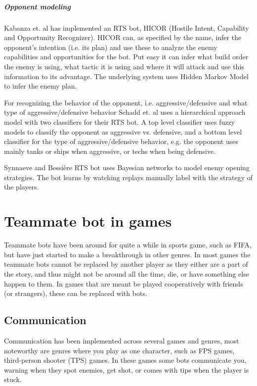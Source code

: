 \subparagraph{Opponent modeling}
Kabanza et. al has implemented an RTS bot, HICOR (Hostile Intent,
Capability and Opportunity Recognizer). HICOR can, as specified by the name, infer the opponent's
intention (i.e. its plan) and use these to analyze the enemy capabilities and opportunities for the
bot. Put easy it can infer what build order the enemy is using, what tactic it is using and where it
will attack and use this information to its advantage. The underlying system uses Hidden Markov
Model to infer the enemy plan.

For recognizing the behavior of the opponent, i.e. aggressive/defensive and what type of
aggressive/defensive behavior Schadd et. al uses a hierarchical approach model with two classifiers
for their RTS bot. A top level classifier uses fuzzy models to classify the opponent as aggressive
vs. defensive, and a bottom level classifier for the type of aggressive/defensive behavior, e.g. the
opponent uses mainly tanks or ships when aggressive, or techs when being defensive.

Synnaeve and Bessière RTS bot uses Bayesian networks to model enemy opening
strategies\cite{synnaeve11}. The bot learns by watching replays manually label with the strategy of
the players.

\section{Teammate bot in games}
Teammate bots have been around for quite a while in sports game,
such as FIFA\cite{fifa}, but have just started to make a breakthrough in other genres. In most
games\cite{callofduty, brotherinarms, rainbow6} the teammate bots cannot be replaced by another
player as they either are a part of the story, and thus might not be around all the time, die, or
have something else happen to them. In games that are meant be played cooperatively with friends (or
strangers), these can be replaced with bots\cite{residentevil5, lostplanet2}.

\subsection{Communication}
\label{sec:game_communication}
Communication has been implemented across
several games and genres, most noteworthy are genres where you play as one character, such as FPS
games, third-person shooter (TPS) games. In these games some bots communicate you, warning when they spot
enemies, get shot, or comes with tips when the player is stuck.

